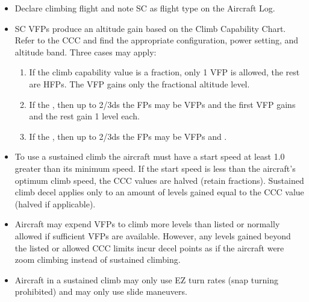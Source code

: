 \begin{itemize}

    \item{} Declare climbing flight and note SC as flight type on the Aircraft Log.
    
    \item{} SC VFPs produce an altitude gain based on the Climb Capability Chart. Refer to the CCC and find the appropriate configuration, power setting, and altitude band. Three cases may apply:
    \begin{enumerate}
        \item If the climb capability value is a fraction, only 1 VFP is allowed, the rest are HFPs. The VFP gains only the fractional altitude level.
        \item If the , then up to 2/3ds the FPs may be VFPs and the first VFP gains  and the rest gain 1 level each.
        \item If the , then up to 2/3ds the FPs may be VFPs and .
    \end{enumerate}

    \item{} To use a sustained climb the aircraft must have a start speed at least 1.0 greater than its minimum speed. If the start speed is less than the aircraft's optimum climb speed, the CCC values are halved (retain fractions). Sustained climb decel applies only to an amount of levels gained equal to the CCC value (halved if applicable).

    \item{} Aircraft may expend VFPs to climb more levels than listed or normally allowed if sufficient VFPs are available. However, any levels gained beyond the listed or allowed CCC limits incur decel points as if the aircraft were zoom climbing instead of sustained climbing.

    \item{} Aircraft in a sustained climb may only use EZ turn rates (snap turning prohibited) and may only use slide maneuvers.


\end{itemize}
